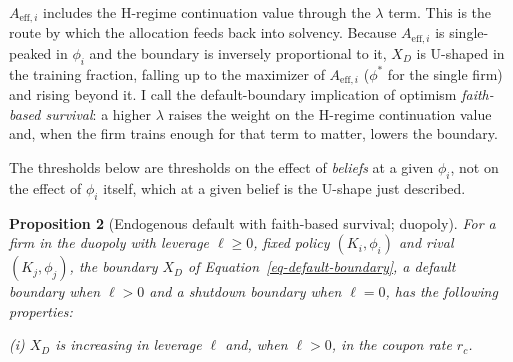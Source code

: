 \documentclass[
  11pt,
  letterpaper,
]{scrartcl}
\begin{document}
\(A_{\text{eff},i}\) includes the H-regime continuation value through
the \(\lambda\) term. This is the route by which the allocation feeds
back into solvency. Because \(A_{\text{eff},i}\) is single-peaked in
\(\phi_i\) and the boundary is inversely proportional to it, \(X_D\) is
U-shaped in the training fraction, falling up to the maximizer of
\(A_{\text{eff},i}\) (\(\phi^*\) for the single firm) and rising beyond
it. I call the default-boundary implication of optimism
\emph{faith-based survival}: a higher \(\lambda\) raises the weight on
the H-regime continuation value and, when the firm trains enough for
that term to matter, lowers the boundary.

The thresholds below are thresholds on the effect of \emph{beliefs} at a
given \(\phi_i\), not on the effect of \(\phi_i\) itself, which at a
given belief is the U-shape just described.

\textbf{Proposition 2} (Endogenous default with faith-based survival;
duopoly). \emph{For a firm in the duopoly with leverage \(\ell \geq 0\),
fixed policy \((K_i, \phi_i)\) and rival \((K_j, \phi_j)\), the boundary
\(X_D\) of Equation~\ref{eq-default-boundary}, a default boundary when
\(\ell > 0\) and a shutdown boundary when \(\ell = 0\), has the
following properties:}

\emph{(i) \(X_D\) is increasing in leverage \(\ell\) and, when
\(\ell > 0\), in the coupon rate \(r_c\).}
\end{document}
